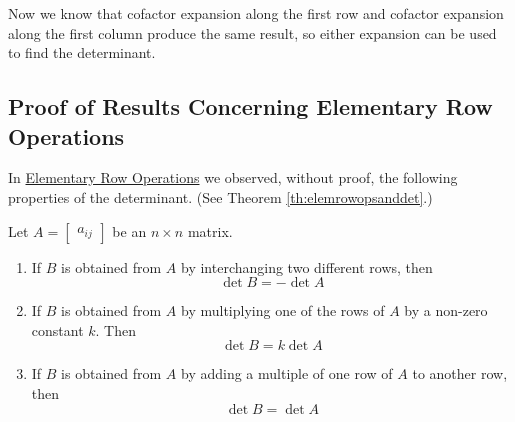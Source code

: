 \documentclass{ximera}
\begin{document}
Now we know that cofactor expansion along the first row and cofactor expansion along the first column produce the same result, so either expansion can be used to find the determinant.  

\subsection*{Proof of Results Concerning Elementary Row Operations}
In \href{https://ximera.osu.edu/oerlinalg/LinearAlgebra/DET-0030/main}{Elementary Row Operations} we observed, without proof, the following properties of the determinant. (See Theorem \ref{th:elemrowopsanddet}.)
\begin{summary}
    Let $A=\begin{bmatrix}a_{ij}\end{bmatrix}$ be an $n\times n$ matrix.  
\begin{enumerate}
\item\label{item:rowswapanddetSUMM}
If $B$ is obtained from $A$ by interchanging two different rows, then $$\det{B}=-\det{A}$$
\item \label{item:rowconstantmultanddetSUMM}
If $B$ is obtained from $A$ by multiplying one of the rows of $A$ by a non-zero constant $k$.  Then $$\det{B}=k\det{A}$$
\item \label{item:addmultotherrowdetSUMM}
If $B$ is obtained from $A$ by adding a multiple of one row of $A$ to another row, then
$$\det{B}=\det{A}$$
\end{enumerate}
\end{summary}
\end{document}
